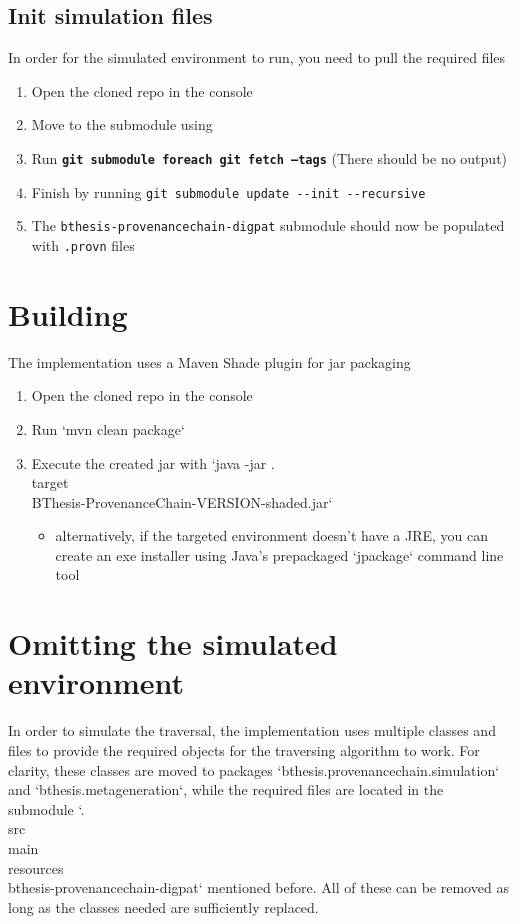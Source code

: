 \documentclass[
  digital,     %
  oneside,     %
  nosansbold,  %
  nocolorbold, %
  lof,         %
  lot,         %
]{fithesis4}
\begin{document}
\subsection{Init simulation files}
In order for the simulated environment to run, you need to pull the required files
\begin{enumerate}
  \item Open the cloned repo in the console
  \item Move to the submodule using 
  \subitem \textbf{}
  \item Run \textbf{\texttt{git submodule foreach git fetch --tags}} (There should be no output)
  \item Finish by running \verb|git submodule update --init --recursive|
  \item The \verb|bthesis-provenancechain-digpat| submodule should now be populated with \verb|.provn| files
\end{enumerate}

\section{Building}
The implementation uses a Maven Shade plugin for jar packaging

\begin{enumerate}
  \item Open the cloned repo in the console
  \item Run `mvn clean package`
  \item Execute the created jar with `java -jar .\\target\\BThesis-ProvenanceChain-VERSION-shaded.jar`
  \begin{itemize}
    \item alternatively, if the targeted environment doesn't have a JRE, you can create an exe installer using Java's prepackaged `jpackage` command line tool
  \end{itemize}
\end{enumerate}
    
\newpage
\shorthandoff{-}
\section{Omitting the simulated environment}
In order to simulate the traversal, the implementation uses multiple classes and files
to provide the required objects for the traversing algorithm to work.
For clarity, these classes are moved to packages `bthesis.provenancechain.simulation` and `bthesis.metageneration`, while the required files are located in the submodule `.\\src\\main\\resources\\bthesis-provenancechain-digpat` mentioned before. All of these can be removed as long as the classes needed are sufficiently replaced.
\shorthandon{-}
\end{document}
